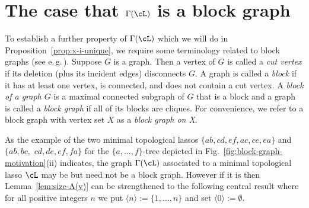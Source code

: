 \section{The case that $\Gamma(\cL)$ is a 
block graph}\label{sec:blockgraph}



To establish a further property of $\Gamma(\cL)$ which we will do in
Proposition~\ref{prop:x-i-unique}, we require some terminology related to
block graphs (see e.\,g.\,\cite{diestel}).  Suppose $G$ is a graph. Then a
vertex of $G$ is called a {\em cut vertex} if its deletion (plus its incident
edges) disconnects $G$. A graph is called a {\em block} if it has at least one
vertex, is connected, and does not contain a cut vertex. A {\em block of a
  graph $G$} is a maximal connected subgraph of $G$ that is a block and a
graph is called a {\em block graph} if all of its blocks are cliques. For
convenience, we refer to a block graph with vertex set $X$ as a {\em block
  graph on X}.

As the example of the two minimal topological lassos $
\{ab,cd,ef,ac,ce,ea\}$ and $
\{ab, bc,$ $cd, de, ef, fa\}$ for the $\{a,\ldots,f\}$-tree depicted in
Fig.~\ref{fig:block-graph-motivation}(ii) indicates, the graph $\Gamma(\cL)$
associated to a minimal topological lasso $\cL$ may be but need not be a block
graph.  However if it is
then Lemma~\ref{lem:size-A(v)} can be strengthened to the following central
result where for all positive integers $n$ we put $\langle n\rangle
:=\{1,\ldots, n\}$ and set $\langle 0\rangle:=\emptyset$.

